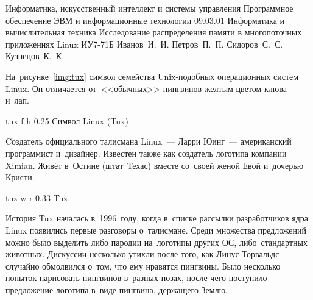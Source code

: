\documentclass{bmstu}
\begin{document}



\makecourseworktitle
    {Информатика, искусственный интеллект и системы управления} %
    {Программное обеспечение ЭВМ и информационные технологии} %
    {09.03.01 Информатика и вычислительная техника} %
    {Исследование распределения памяти в многопоточных приложениях Linux} %
    {ИУ7-71Б} %
    {Иванов~И.~И.} %
    {Петров~П.~П.} %
    {Сидоров~С.~С.} %
    {Кузнецов~К.~К.} %





На~рисунке~\ref{img:tux} символ семейства Unix-подобных операционных систем Linux.
Он отличается от~<<обычных>> пингвинов желтым цветом клюва и~лап.

    {tux} %
    {f} %
    {h} %
    {0.25\textwidth} %
    {Символ Linux (Tux)} %

Cоздатель официального талисмана Linux~--- Ларри Юинг~--- американский программист и~дизайнер.
Известен также как создатель логотипа компании Ximian.
Живёт в~Остине (штат~Техас) вместе со~своей женой Евой и~дочерью Кристи.


    {tuz} %
    {w} %
    {r} %
    {0.33\textwidth} %
    {Tuz} %

История Tux началась в~1996~году, когда в~списке рассылки разработчиков ядра Linux появились первые разговоры о~талисмане.
Среди множества предложений можно было выделить либо пародии на~логотипы других ОС, либо~стандартных животных.
Дискуссии несколько утихли после того, как Линус Торвальдс случайно обмолвился о~том, что ему нравятся пингвины.
Было несколько попыток нарисовать пингвинов в~разных позах, после чего поступило предложение логотипа в~виде пингвина, держащего Землю.
\end{document}
